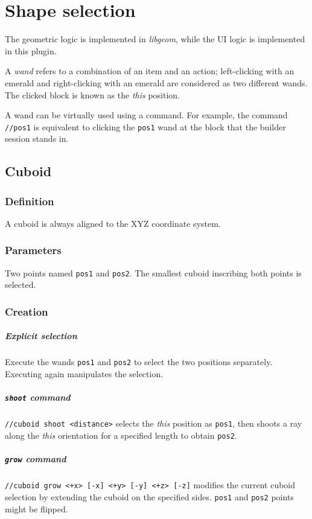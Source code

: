 \documentclass{report}
\begin{document}
		\chapter{Shape selection}
			The geometric logic is implemented in \textit{libgeom}, while the UI logic is implemented in this plugin.

			A \emph{wand} refers to a combination of an item and an action; left-clicking with an emerald and
			right-clicking with an emerald are considered as two different wands. The clicked block is known as the
			\textit{this} position.

			A wand can be virtually used using a command. For example, the command \texttt{//pos1} is equivalent to
			clicking the \texttt{pos1} wand at the block that the builder session stands in.

			\section{Cuboid}
				\subsection{Definition} A cuboid is always aligned to the XYZ coordinate system.
				\subsection{Parameters} Two points named \texttt{pos1} and \texttt{pos2}. The smallest cuboid
				inscribing both points is selected.
				\subsection{Creation}
					\paragraph{Explicit selection} Execute the wands \texttt{pos1} and \texttt{pos2} to select the two
					positions separately. Executing again manipulates the selection.
					\paragraph{\texttt{shoot} command} \texttt{//cuboid shoot <distance>} selects the \textit{this}
					position as \texttt{pos1}, then shoots a ray along the \textit{this} orientation for a specified length to
					obtain \texttt{pos2}.
					\paragraph{\texttt{grow} command} \texttt{//cuboid grow <+x> [-x] <+y> [-y] <+z> [-z]} modifies the
					current cuboid selection by extending the cuboid on the specified sides. \texttt{pos1} and \texttt{pos2}
					points might be flipped.
\end{document}
